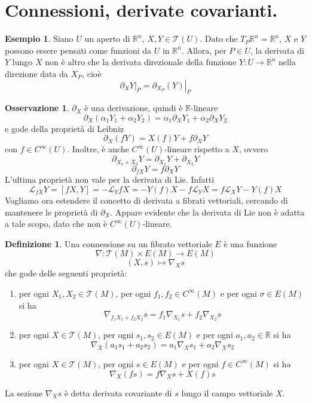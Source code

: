 \documentclass[a4paper,11pt]{article}
\theoremstyle{definition}
\newtheorem{osservazione}{Osservazione}[section]
\newtheorem{definizione}{Definizione}[section]
\newtheorem{esempio}{Esempio}[section]
\theoremstyle{theorem}
\newcommand{\lie}[2]{\mathcal{L}_{#1}#2}
\newcommand{\R}{\mathbb{R}}
\newcommand{\T}{\mathcal{T}}
\begin{document}
\section{Connessioni, derivate covarianti.}
\begin{esempio}
	Siano $U$ un aperto di $\R^n$, $X,Y\in\mathcal{T}(U)$. Dato che $T_P\R^n=\R^n$, $X$ e $Y$ possono essere pensati come funzioni da $U$ in $\R^n$. Allora, per $P\in U$, la derivata di $Y$ lungo $X$ non è altro che la derivata direzionale della funzione $Y\colon U\to\R^n$ nella direzione data da $X_P$, cioè
	\[\left.\partial_X Y\right|_P=\left.\partial_{X_P}\left(Y\right)\right|_P\]
\end{esempio}
\begin{osservazione}
	$\partial_X$ è una derivazione, quindi è $\R$-lineare
	\[\partial_X\left(\alpha_1Y_1+\alpha_2Y_2\right)=\alpha_1\partial_XY_1+\alpha_2\partial_XY_2\]
	e gode della proprietà di Leibniz
	\[\partial_X\left(fY\right)=X(f)Y+f\partial_XY\]
	con $f\in C^\infty(U)$. Inoltre, è anche $C^\infty(U)$-lineare rispetto a $X$, ovvero
	\[\partial_{X_1+X_2}Y=\partial_{X_1}Y+\partial_{X_2}Y\]
	\[\partial_{fX}Y=f\partial_XY\]
	L'ultima proprietà non vale per la derivata di Lie. Infatti
	\[\lie{fX}{Y}=[fX,Y]=-\lie{Y}{fX}=-Y(f)X-f\lie{Y}{X}=f\lie{X}{Y}-Y(f)X\]
	Vogliamo ora estendere il concetto di derivata a fibrati vettoriali, cercando di mantenere le proprietà di $\partial_X$. Appare evidente che la derivata di Lie non è adatta a tale scopo, dato che non è $C^\infty(U)$-lineare.
\end{osservazione}
\begin{definizione}
	Una connessione su un fibrato vettoriale $E$ è una funzione \[\nabla\colon\T(M)\times E(M)\to E(M)\]
	\[(X,s)\mapsto\nabla_Xs\]
	che gode delle seguenti proprietà:
	\begin{enumerate}
		\item per ogni $X_1,X_2\in\T(M)$, per ogni $f_1,f_2\in C^\infty(M)$ e per ogni $\sigma\in E(M)$ si ha
		\[\nabla_{f_1X_1+f_2X_2}s=f_1\nabla_{X_1}s+f_2\nabla_{X_2}s\]
		\item per ogni $X\in\T(M)$, per ogni $s_1,s_2\in E(M)$ e per ogni $a_1,a_2\in\R$ si ha
		\[\nabla_X\left(a_1s_1+a_2s_2\right)=a_1\nabla_Xs_1+a_2\nabla_Xs_2\]
		\item per ogni $X\in\T(M)$, per ogni $s\in E(M)$ e per ogni $f\in C^\infty(M)$ si ha
		\[\nabla_X(fs)=f\nabla_Xs+X(f)s\]
	\end{enumerate}
	La sezione $\nabla_Xs$ è detta derivata covariante di $s$ lungo il campo vettoriale $X$.
\end{definizione}
\end{document}

